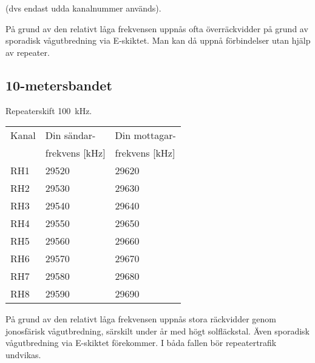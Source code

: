 (dvs endast udda kanalnummer används).

På grund av den relativt låga frekvensen uppnås ofta överräckvidder på grund av
sporadisk vågutbredning via E-skiktet.
Man kan då uppnå förbindelser utan hjälp av repeater.

\subsection{10-metersbandet}
Repeaterskift \SI{100}{\kilo\hertz}.

\begin{tabular}{ l | l | l }
  Kanal & Din sändar- & Din mottagar- \\
        & frekvens [kHz] & frekvens [kHz] \\
  \hline
  RH1 & 29520 & 29620 \\
  RH2 & 29530 & 29630 \\
  RH3 & 29540 & 29640 \\
  RH4 & 29550 & 29650 \\
  RH5 & 29560 & 29660 \\
  RH6 & 29570 & 29670 \\
  RH7 & 29580 & 29680 \\
  RH8 & 29590 & 29690 \\
\end{tabular}

På grund av den relativt låga frekvensen uppnås stora räckvidder genom
jonosfärisk vågutbredning, särskilt under år med högt solfläckstal.
Även sporadisk vågutbredning via E-skiktet förekommer.
I båda fallen bör repeatertrafik undvikas.
